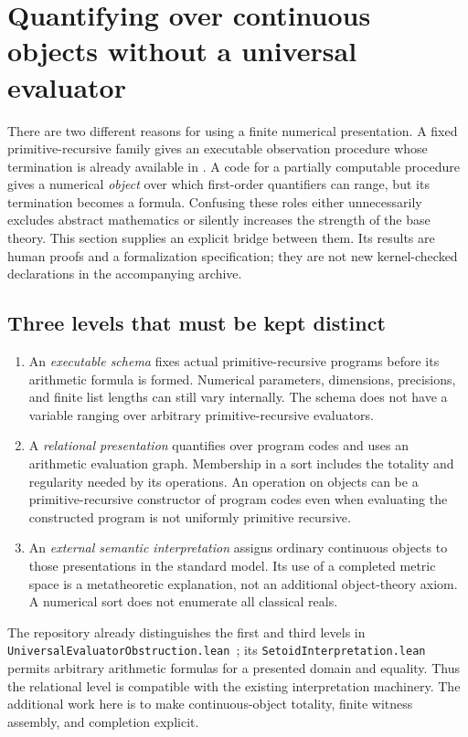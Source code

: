\section{Quantifying over continuous objects without a universal evaluator}
\label{sec:relational-codes}
\label{sec:relational}

There are two different reasons for using a finite numerical presentation. A
fixed primitive-recursive family gives an executable observation procedure
whose termination is already available in \ipra. A code for a partially
computable procedure gives a numerical \emph{object} over which first-order
quantifiers can range, but its termination becomes a formula. Confusing these
roles either unnecessarily excludes abstract mathematics or silently increases
the strength of the base theory. This section supplies an explicit bridge
between them. Its results are human proofs and a formalization specification;
they are not new kernel-checked declarations in the accompanying archive.

\subsection{Three levels that must be kept distinct}

\begin{enumerate}
\item An \emph{executable schema} fixes actual primitive-recursive programs
before its arithmetic formula is formed. Numerical parameters, dimensions,
precisions, and finite list lengths can still vary internally. The schema does
not have a variable ranging over arbitrary primitive-recursive evaluators.
\item A \emph{relational presentation} quantifies over program codes and uses
an arithmetic evaluation graph. Membership in a sort includes the totality and
regularity needed by its operations. An operation on objects can be a
primitive-recursive constructor of program codes even when evaluating the
constructed program is not uniformly primitive recursive.
\item An \emph{external semantic interpretation} assigns ordinary continuous
objects to those presentations in the standard model. Its use of a completed
metric space is a metatheoretic explanation, not an additional object-theory
axiom. A numerical sort does not enumerate all classical reals.
\end{enumerate}

The repository already distinguishes the first and third levels in
\texttt{Universal\allowbreak Evaluator\allowbreak Obstruction.lean}~\cite{repo-evaluator}; its
\texttt{SetoidInterpretation.lean}~\cite{repo-setoid} permits arbitrary arithmetic formulas for a
presented domain and equality. Thus the relational level is compatible with
the existing interpretation machinery. The additional work here is to make
continuous-object totality, finite witness assembly, and completion explicit.

